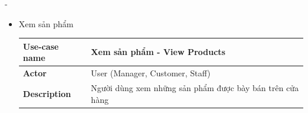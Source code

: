 \begin {list} {-}{}
\begin{itemize}
\begin{table}[h]
\begin{tabular}{|l|l|}
        \end{tabular}
        \begin{center}
            Bảng 3.2: Đặc tả use case đăng ký tài khoản
        \end{center}
    \end{table}
    \newpage
    \item Xem sản phẩm
    \begin{table}[h]
        \begin{tabular}{|l|l|}
        \hline
        \textbf{Use-case name}    & \textbf{Xem sản phẩm - View Products}                                                                                                                                                                                                                                                                                                                                                                                                                                                                                                                                                                                                                                                                                                                                                                           \\ \hline
        \textbf{Actor}            & User (Manager, Customer, Staff)                                                                                                                                                                                                                                                                                                                                                                                                                                                                                                                                                                                                                                                                                                                                                                                 \\ \hline
        \textbf{Description}      & Người dùng xem những sản phẩm được bày bán trên cửa hàng                                                                                                                                                                                                                                                                                                                                                                                                                                                                                                                                                                                                                                                                                                                                                        \\ \hline

\end{tabular}
\end{table}
\end{itemize}
\end{list}
